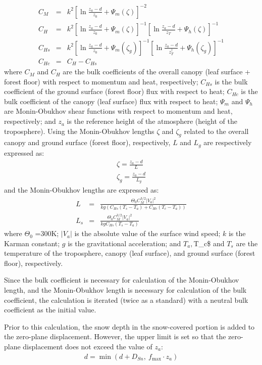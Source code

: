 \begin{eqnarray}
 C_M &=& k^2 \left[ \ln \frac{z_a-d}{z_0} + \Psi_m(\zeta) \right]^{-2} \\
 C_H &=& k^2 \left[ \ln \frac{z_a-d}{z_0} + \Psi_m(\zeta) \right]^{-1}
             \left[ \ln \frac{z_a-d}{z_T} + \Psi_h(\zeta) \right]^{-1} \\
 C_{Hs} &=& k^2 \left[ \ln \frac{z_a-d}{z_0} + \Psi_m(\zeta_g) \right]^{-1}
             \left[ \ln \frac{z_a-d}{z_T^{\dagger}} + \Psi_h(\zeta_g) \right]^{-1} \\
 C_{Hc} &=& C_H - C_{Hs}
\end{eqnarray} where \(C_M\) and \(C_H\) are the bulk coefficients of the overall canopy (leaf surface + forest floor) with respect to momentum and heat, respectively; \(C_{Hs}\) is the bulk coefficient of the
ground surface (forest floor) flux with respect to heat; \(C_{Hc}\) is the bulk coefficient of the canopy (leaf surface) flux with respect to heat; \(\Psi_m\) and \(\Psi_h\) are Monin-Obukhov shear
functions with respect to momentum and heat, respectively; and \(z_a\) is the reference height of the atmosphere (height of the troposphere). Using the Monin-Obukhov lengths \(\zeta\) and \(\zeta_g\)
related to the overall canopy and ground surface (forest floor), respectively, \(L\) and \(L_g\) are respectively expressed as: \begin{eqnarray}
 \zeta = \frac{z_a - d}{L} \\
 \zeta_g = \frac{z_a - d}{L_g}
\end{eqnarray} and the Monin-Obukhov lengths are expressed as: \begin{eqnarray}
 L &=& \frac{\Theta_0 C_M^{3/2}|V_a|^2}{kg(C_{Hs}(T_s - T_a) + C_{Hc}(T_c - T_a))} \\
 L_s &=& \frac{\Theta_0 C_M^{3/2}|V_a|^2}{kg C_{Hs}(T_s - T_a)}
\end{eqnarray} where \(\Theta_0\) =300K; \(|V_a|\) is the absolute value of the surface wind speed; \(k\) is the Karman constant; \(g\) is the gravitational acceleration; and \(T_a,\)T\_c\$ and \(T_s\) are the
temperature of the troposphere, canopy (leaf surface), and ground surface (forest floor), respectively.

Since the bulk coefficient is necessary for calculation of the Monin-Obukhov length, and the Monin-Obukhov length is necessary for calculation of the bulk coefficient, the calculation is iterated
(twice as a standard) with a neutral bulk coefficient as the initial value.

Prior to this calculation, the snow depth in the snow-covered portion is added to the zero-plane displacement. However, the upper limit is set so that the zero-plane displacement does not exceed the
value of \(z_a\): \begin{eqnarray}
 d = \min( d + D_{Sn} ,\  f_{\max} \cdot z_a )
\end{eqnarray}


